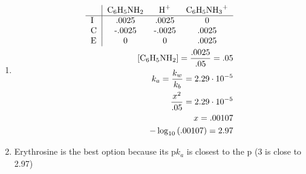 \documentclass[12pt]{article}
\begin{document}
\begin{enumerate}
\begin{enumerate}
      \item 

        \begin{equation}
          \begin{split}
            \begin{tabular}{l | c c c}
              & \ce{C6H5NH2} & \ce{H+} & \ce{C6H5NH3+}\\
              \hline
              \text{I} & .0025 & .0025 & 0\\
              \text{C} & -.0025 & -.0025 & .0025\\
              \text{E} & 0 & 0 & .0025\\
            \end{tabular}\\
            [\ce{C6H5NH2}]=\frac{.0025}{.05}=.05\\
            k_a=\frac{k_w}{k_b}=2.29\cdot10^{-5}\\
            \frac{x^2}{.05}=2.29\cdot10^{-5}\\
            x=.00107\\
            -\log_{10}\left( .00107  \right)=2.97
          \end{split}
          \label{4}
        \end{equation}

      \item Erythrosine is the best option because its p$k_a$ is closest to the p (3 is close to 2.97)

    \end{enumerate}

\end{enumerate}
\end{document}
